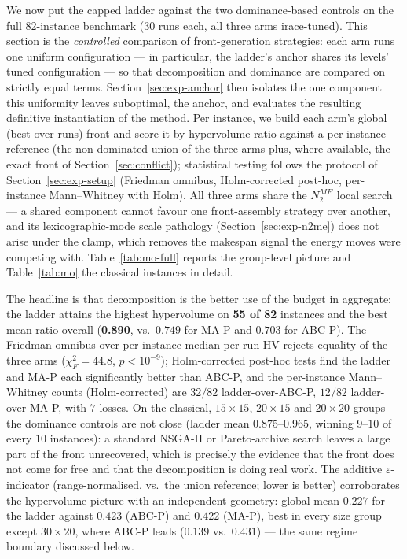 \documentclass[preprint,12pt]{elsarticle}
\begin{document}
We now put the capped ladder against the two dominance-based controls on the
full 82-instance benchmark (30 runs each, all three arms irace-tuned). This
section is the \emph{controlled} comparison of front-generation strategies:
each arm runs one uniform configuration --- in particular, the ladder's
anchor shares its levels' tuned configuration --- so that decomposition and
dominance are compared on strictly equal terms.
Section~\ref{sec:exp-anchor} then isolates the one component this uniformity
leaves suboptimal, the anchor, and evaluates the resulting definitive
instantiation of the method.
Per instance, we build each arm's global (best-over-runs) front and score it
by hypervolume ratio against a per-instance reference (the non-dominated
union of the three arms plus, where available, the exact front of
Section~\ref{sec:conflict}); statistical testing follows the protocol of
Section~\ref{sec:exp-setup} (Friedman omnibus, Holm-corrected post-hoc,
per-instance Mann--Whitney with Holm). All three arms share the $N_2^{ME}$
local search --- a shared component cannot favour one front-assembly
strategy over another, and its lexicographic-mode scale pathology
(Section~\ref{sec:exp-n2me}) does not arise under the clamp, which removes
the makespan signal the energy moves were competing with.
Table~\ref{tab:mo-full} reports the group-level picture and
Table~\ref{tab:mo} the classical instances in detail.

The headline is that decomposition is the better use of the budget in
aggregate: the ladder attains the highest hypervolume on \textbf{55 of 82}
instances and the best mean ratio overall (\textbf{0.890}, vs.\ $0.749$ for
MA-P and $0.703$ for ABC-P). The Friedman omnibus over per-instance median
per-run HV rejects equality of the three arms
($\chi^2_F=44.8$, $p<10^{-9}$); Holm-corrected post-hoc tests find the
ladder and MA-P each significantly better than ABC-P, and the per-instance
Mann--Whitney counts (Holm-corrected) are $32/82$ ladder-over-ABC-P,
$12/82$ ladder-over-MA-P, with $7$ losses. On the
classical, $15{\times}15$, $20{\times}15$ and $20{\times}20$ groups the
dominance controls are not close (ladder mean $0.875$--$0.965$, winning
$9$--$10$ of every $10$ instances): a standard NSGA-II or Pareto-archive
search leaves a large part of the front unrecovered, which is precisely the
evidence that the front does not come for free and that the decomposition is
doing real work. The additive $\varepsilon$-indicator \cite{Zitzler2003}
(range-normalised, vs.\ the union reference; lower is better) corroborates
the hypervolume picture with an independent geometry: global mean $0.227$
for the ladder against $0.423$ (ABC-P) and $0.422$ (MA-P), best in every
size group except $30{\times}20$, where ABC-P leads ($0.139$ vs.\ $0.431$)
--- the same regime boundary discussed below.
\end{document}
